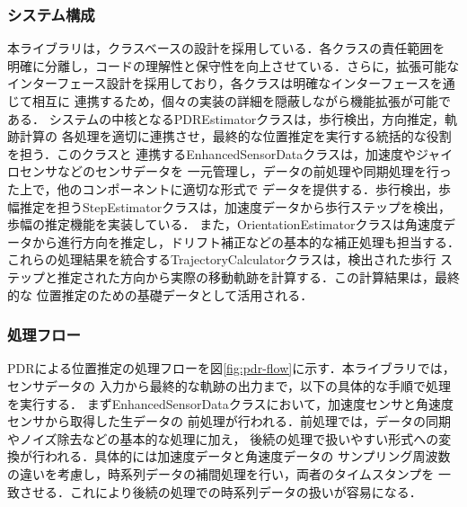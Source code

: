 \subsubsection{システム構成}

本ライブラリは，クラスベースの設計を採用している．各クラスの責任範囲を
明確に分離し，コードの理解性と保守性を向上させている．さらに，拡張可能な
インターフェース設計を採用しており，各クラスは明確なインターフェースを通じて相互に
連携するため，個々の実装の詳細を隠蔽しながら機能拡張が可能である．
システムの中核となるPDREstimatorクラスは，歩行検出，方向推定，軌跡計算の
各処理を適切に連携させ，最終的な位置推定を実行する統括的な役割を担う．このクラスと
連携するEnhancedSensorDataクラスは，加速度やジャイロセンサなどのセンサデータを
一元管理し，データの前処理や同期処理を行った上で，他のコンポーネントに適切な形式で
データを提供する．歩行検出，歩幅推定を担うStepEstimatorクラスは，加速度データから歩行ステップを検出，歩幅の推定機能を実装している．
また，OrientationEstimatorクラスは角速度データから進行方向を推定し，ドリフト補正などの基本的な補正処理も担当する．
これらの処理結果を統合するTrajectoryCalculatorクラスは，検出された歩行
ステップと推定された方向から実際の移動軌跡を計算する．この計算結果は，最終的な
位置推定のための基礎データとして活用される．

\subsubsection{処理フロー}
PDRによる位置推定の処理フローを図\ref{fig:pdr-flow}に示す．本ライブラリでは，センサデータの
入力から最終的な軌跡の出力まで，以下の具体的な手順で処理を実行する．
まずEnhancedSensorDataクラスにおいて，加速度センサと角速度センサから取得した生データの
前処理が行われる．前処理では，データの同期やノイズ除去などの基本的な処理に加え，
後続の処理で扱いやすい形式への変換が行われる．具体的には加速度データと角速度データの
サンプリング周波数の違いを考慮し，時系列データの補間処理を行い，両者のタイムスタンプを
一致させる．これにより後続の処理での時系列データの扱いが容易になる．

